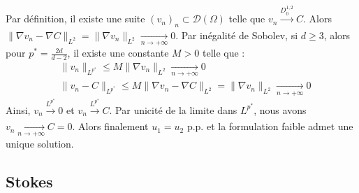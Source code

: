 Par définition, il existe une suite $(v_n)_n \subset \mathcal{D}(\Omega)$ telle que $v_n \xrightarrow[]{D_0^{1,2}} C$. Alors $\|\nabla v_n - \nabla C\|_{L^2} = \|\nabla v_n\|_{L^2} \xrightarrow[n \to +\infty]{} 0$.
Par inégalité de Sobolev, si $d \geq 3$, alors pour $p^* = \frac{2d}{d - 2}$, il existe une constante $M > 0$ telle que :
\begin{align*}
    &\|v_n\|_{L^{p^*}} \leq M\|\nabla v_n\|_{L^2} \xrightarrow[n \to +\infty]{} 0 \\
    &\|v_n - C\|_{L^{p^*}} \leq M\|\nabla v_n - \nabla C\|_{L^2} = \|\nabla v_n\|_{L^2} \xrightarrow[n \to +\infty]{} 0
\end{align*}
Ainsi, $v_n \xrightarrow[]{L^{p^*}} 0$ et $v_n \xrightarrow[]{L^{p^*}} C$. Par unicité de la limite dans $L^{p^*}$, nous avons $v_n \xrightarrow[n \to +\infty]{} C = 0$.
Alors finalement $u_1 = u_2$ p.p. et la formulation faible admet une unique solution.

\subsection{Stokes}

